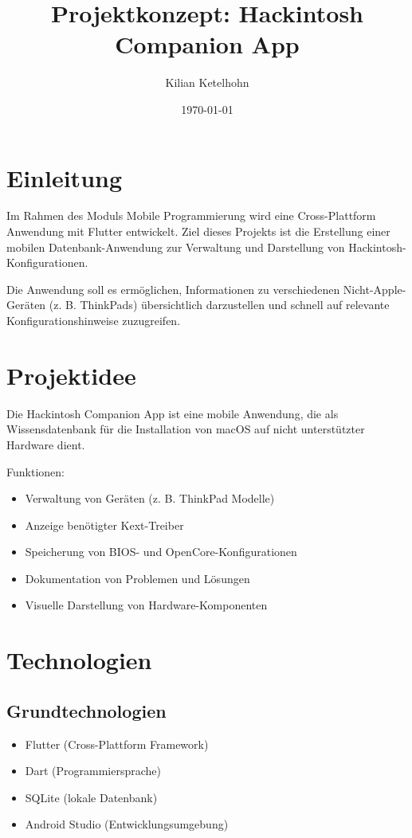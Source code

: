 \documentclass[a4paper,12pt]{article}
\title{Projektkonzept: Hackintosh Companion App}
\author{Kilian Ketelhohn}
\date{\today}
\begin{document}
\maketitle

\section{Einleitung}
Im Rahmen des Moduls Mobile Programmierung wird eine Cross-Plattform Anwendung mit Flutter entwickelt. Ziel dieses Projekts ist die Erstellung einer mobilen Datenbank-Anwendung zur Verwaltung und Darstellung von Hackintosh-Konfigurationen.

Die Anwendung soll es ermöglichen, Informationen zu verschiedenen Nicht-Apple-Geräten (z. B. ThinkPads) übersichtlich darzustellen und schnell auf relevante Konfigurationshinweise zuzugreifen.

\section{Projektidee}
Die Hackintosh Companion App ist eine mobile Anwendung, die als Wissensdatenbank für die Installation von macOS auf nicht unterstützter Hardware dient.

Funktionen:
\begin{itemize}
\item Verwaltung von Geräten (z. B. ThinkPad Modelle)
\item Anzeige benötigter Kext-Treiber
\item Speicherung von BIOS- und OpenCore-Konfigurationen
\item Dokumentation von Problemen und Lösungen
\item Visuelle Darstellung von Hardware-Komponenten
\end{itemize}

\section{Technologien}

\subsection{Grundtechnologien}
\begin{itemize}
\item Flutter (Cross-Plattform Framework)
\item Dart (Programmiersprache)
\item SQLite (lokale Datenbank)
\item Android Studio (Entwicklungsumgebung)
\end{itemize}
\end{document}
